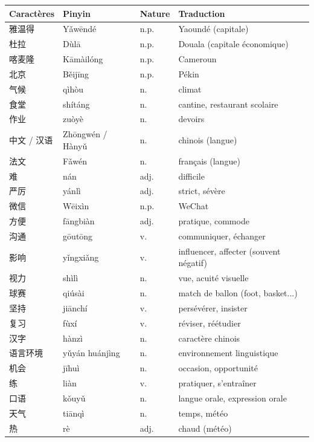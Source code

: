 \documentclass[11pt]{article}
\begin{document}
\begin{center}
\begin{tabularx}{\linewidth}{|X|X|X|X|}
\hline
\rowcolor{popblueL} \textbf{Caractères} & \textbf{Pinyin} & \textbf{Nature} & \textbf{Traduction} \\
\hline
雅温得 & Yǎwēndé & n.p. & Yaoundé (capitale) \\
\hline
杜拉 & Dùlā & n.p. & Douala (capitale économique) \\
\hline
喀麦隆 & Kāmàilóng & n.p. & Cameroun \\
\hline
北京 & Běijīng & n.p. & Pékin \\
\hline
气候 & qìhòu & n. & climat \\
\hline
食堂 & shítáng & n. & cantine, restaurant scolaire \\
\hline
作业 & zuòyè & n. & devoirs \\
\hline
中文 / 汉语 & Zhōngwén / Hànyǔ & n. & chinois (langue) \\
\hline
法文 & Fǎwén & n. & français (langue) \\
\hline
难 & nán & adj. & difficile \\
\hline
严厉 & yánlì & adj. & strict, sévère \\
\hline
微信 & Wēixìn & n.p. & WeChat \\
\hline
方便 & fāngbiàn & adj. & pratique, commode \\
\hline
沟通 & gōutōng & v. & communiquer, échanger \\
\hline
影响 & yǐngxiǎng & v. & influencer, affecter (souvent négatif) \\
\hline
视力 & shìlì & n. & vue, acuité visuelle \\
\hline
球赛 & qiúsài & n. & match de ballon (foot, basket...) \\
\hline
坚持 & jiānchí & v. & persévérer, insister \\
\hline
复习 & fùxí & v. & réviser, réétudier \\
\hline
汉字 & hànzì & n. & caractère chinois \\
\hline
语言环境 & yǔyán huánjìng & n. & environnement linguistique \\
\hline
机会 & jīhuì & n. & occasion, opportunité \\
\hline
练 & liàn & v. & pratiquer, s'entraîner \\
\hline
口语 & kǒuyǔ & n. & langue orale, expression orale \\
\hline
天气 & tiānqì & n. & temps, météo \\
\hline
热 & rè & adj. & chaud (météo) \\

\end{tabularx}
\end{center}
\end{document}
